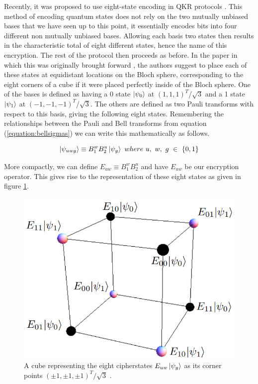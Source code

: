 \documentclass[]{article}
\begin{document}
Recently, it was proposed to use eight-state encoding in QKR protocols \cite{DeVries2016}. This method of encoding quantum states does not rely on the two mutually unbiased bases that we have seen up to this point, it essentially encodes bits into four different non mutually unbiased bases. Allowing each basis two states then results in the characteristic total of eight different states, hence the name of this encryption. The rest of the protocol then proceeds as before. In the paper in which this was originally brought forward \cite{DeVries2016}, the authors suggest to place each of these states at equidistant locations on the Bloch sphere, corresponding to the eight corners of a cube if it were placed perfectly inside of the Bloch sphere. One of the bases is defined as having a 0 state $\ket{\psi_{0}}$ at $(1,1,1)^T$/$\sqrt{3}$ and a 1 state $\ket{\psi_{1}}$ at $(-1,-1,-1)^T$/$\sqrt{3}$. The others are defined as two Pauli transforms with respect to this basis, giving the following eight states. Remembering the relationships between the Pauli and Bell transforms from equation (\ref{equation:bellsigmas}) we can write this mathematically as follows.

\begin{equation}
	\label{equation:EightStatePaulis}
	\ket{\psi_{uwg}} \equiv B_1^w B_2^u\ket{\psi_{g}}~where~ u,~ w,~ g~ \in~ \{0,1\}
\end{equation}

More compactly, we can define $E_{uw} \equiv B_1^w B_2^u$ and have $E_{uw}$ be our encryption operator. This gives rise to the representation of these eight states as given in figure \ref{fig:eightstatecube}.

\begin{center}
\begin{figure}
	\begin{center}
	\includegraphics[width=0.5\linewidth]{Eightstatecube.png}
	\caption{A cube representing the eight cipherstates $E_{uw}\ket{\psi_{g}}$ as its corner points $(\pm1,\pm1,\pm1)^T/\sqrt{3}$ \cite{DeVries2016}.}
	\label{fig:eightstatecube}
	\end{center}
\end{figure}
\end{center}
\end{document}
